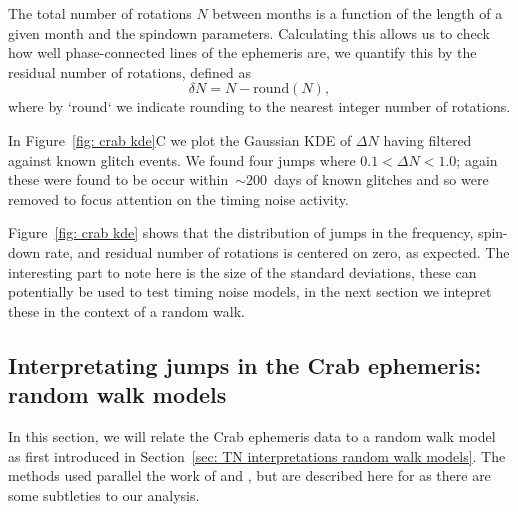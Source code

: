 \documentclass[../full_thesis/full_thesis.tex]{subfiles}
\begin{document}
{The total number of rotations $N$ between months is a function of
the length of a given month and the spindown parameters. Calculating this
allows us to check how well phase-connected lines of the ephemeris are,
we quantify this by the residual number of rotations, defined as
\begin{equation}
\delta N = N - \textrm{round}(N),
\end{equation}
where by `round` we indicate rounding to the nearest integer number of rotations.

In Figure~\ref{fig: crab kde}C we plot the Gaussian KDE of $\Delta N$ having filtered
against known glitch events. We found four jumps where $0.1 < \Delta N < 1.0$;
again these were found to be occur within~$\sim200$~days of known glitches and
so were removed to focus attention on the timing noise activity.

Figure~\ref{fig: crab kde} shows that the distribution of jumps in the frequency,
spin-down rate, and residual number of rotations is centered on zero, as
expected. The interesting part to note here is the size of the standard deviations,
these can potentially be used to test timing noise models, in the next section
we intepret these in the context of a random walk.

\subsection{Interpretating jumps in the Crab ephemeris: random walk models}
\label{sec: crab RW}

In this section, we will relate the Crab ephemeris data to a random walk model
as first introduced in Section~\ref{sec: TN interpretations random walk models}.
The methods used parallel the work of \citet{Cordes1980} and \citet{Groth1975},
but are described here for as there are some subtleties to our analysis.

}
\end{document}
